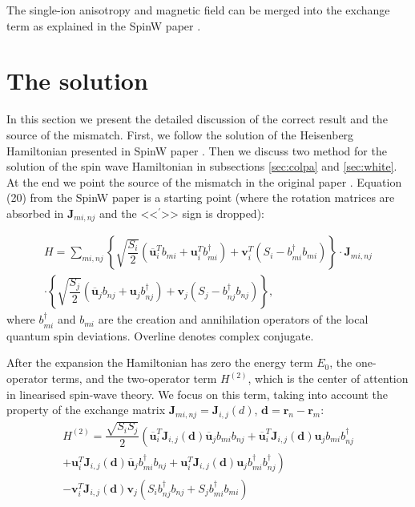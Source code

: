 \documentclass[a4paper,12pt]{article}
\begin{document}
        The single-ion anisotropy and magnetic field can be merged into the exchange term as explained in the SpinW paper \cite{toth2015linear}.

    \section{The solution}

        In this section we present the detailed discussion of the correct result and the source of the mismatch. First, we follow the solution of the Heisenberg Hamiltonian presented in SpinW paper \cite{toth2015linear}.
        Then we discuss two method for the solution of the spin wave Hamiltonian in subsections \ref{sec:colpa} and \ref{sec:white}. At the end we point the source of the mismatch in the original paper \cite{toth2015linear}.
        Equation (20) from the SpinW paper \cite{toth2015linear} is a starting point
        (where the rotation matrices are absorbed in $\boldsymbol{J}_{mi, nj}$ and the <<$^{\prime}$>> sign is dropped):

        \begin{multline}
            H = \sum_{mi, nj}\left\{\sqrt{\dfrac{S_{i}}{2}}\left(\overline{\boldsymbol{u}}^T_i b_{mi} + \boldsymbol{u}^T_i b^{\dag}_{mi} \right) + 
            \boldsymbol{v}^T_i(S_i - b^{\dag}_{mi}b_{mi})\right\}  \cdot
            \boldsymbol{J}_{mi, nj}\\
            \cdot\left\{\sqrt{\dfrac{S_{j}}{2}}\left(\overline{\boldsymbol{u}}_j b_{nj} + \boldsymbol{u}_j b^{\dag}_{nj} \right) + 
            \boldsymbol{v}_j(S_j - b^{\dag}_{nj}b_{nj})\right\},
        \end{multline}
        where $b^{\dag}_{mi}$ and $b_{mi}$ are the creation and annihilation operators of the local quantum spin deviations. Overline denotes complex conjugate.

        After the expansion the Hamiltonian has zero the energy term $E_0$, the one-operator terms, 
        and the two-operator term $H^{(2)}$, which is the center of attention in linearised spin-wave theory. 
        We focus on this term, taking into account the property of the exchange matrix $\boldsymbol{J}_{mi, nj} = \boldsymbol{J}_{i,j}(d)$, $\boldsymbol{d} = \boldsymbol{r}_n - \boldsymbol{r}_m$:
        \begin{multline}
            H^{(2)} = \dfrac{\sqrt{S_i S_j}}{2}\left(\overline{\boldsymbol{u}}^T_i\boldsymbol{J}_{i,j}(\boldsymbol{d})\overline{\boldsymbol{u}}_jb_{mi}b_{nj} +
            \overline{\boldsymbol{u}}^T_i\boldsymbol{J}_{i,j}(\boldsymbol{d})\boldsymbol{u}_j b_{mi}b^{\dag}_{nj}\right. \\+ 
            \left.\boldsymbol{u}^T_i\boldsymbol{J}_{i,j}(\boldsymbol{d})\overline{\boldsymbol{u}}_jb^{\dag}_{mi}b_{nj} +
            \boldsymbol{u}^T_i\boldsymbol{J}_{i,j}(\boldsymbol{d})\boldsymbol{u}_jb^{\dag}_{mi}b^{\dag}_{nj}\right) \\-
            \boldsymbol{v}^T_i\boldsymbol{J}_{i,j}(\boldsymbol{d})\boldsymbol{v}_j\left(S_ib^{\dag}_{nj}b_{nj} + S_jb^{\dag}_{mi}b_{mi}\right)
        \end{multline}
\end{document}
